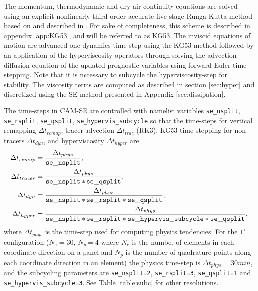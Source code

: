 \documentclass{agujournal}
\begin{document}
{The momentum, thermodynamic and dry air continuity equations are solved using an explicit nonlinearly third-order accurate five-stage Runga-Kutta method based on \cite{KG1984MCSb} and described in \cite[][ see their equation (56)]{GU2016GMD}. For sake of completeness, this scheme is described in appendix \ref{app:KG53}, and will be referred to as KG53.  The inviscid equations of motion are advanced one dynamics time-step using the KG53 method followed by an application of the hyperviscosity operators through solving the advection-diffusion equation of the updated prognostic variables using forward Euler time-stepping. Note that it is necessary to subcycle the hyperviscosity-step for stability. The viscosity terms are computed as described in section \ref{sec:hyper} and discretized using the SE method presented in Appendix \ref{sec:dissipation}.


The time-steps in CAM-SE are controlled with namelist variables {\tt{se\_nsplit}}, {\tt{se\_rsplit}}, {\tt{se\_qsplit}},
{\tt{se\_hypervis\_subcycle}}  so that the time-steps for vertical remapping $\Delta t_{remap}$, tracer advection $\Delta t_{trac}$ (RK3), KG53 time-stepping for non-tracers $\Delta t_{dyn}$, and hyperviscosity $\Delta t_{hyper}$ are
\begin{align}
\Delta t_{remap}&=\frac{\Delta t_{phys}}{\tt{se\_nsplit}},\\
\Delta t_{tracer}&=\frac{\Delta t_{phys}}{\tt{se\_nsplit}*\tt{se\_qsplit}},\\
\Delta t_{dyn}&=\frac{\Delta t_{phys}}{\tt{se\_nsplit*se\_rsplit}*\tt{se\_qsplit}},\\
\Delta t_{hyper}&=\frac{\Delta t_{phys}}{\tt{se\_nsplit*se\_rsplit*se\_hypervis\_subcycle}*\tt{se\_qsplit}},
\end{align}
where $\Delta t_{phys}$ is the time-step used for computing physics tendencies. For the $1^\circ$ configuration ($N_e=30$, $N_p=4$ where $N_e$ is the number of elements in each coordinate direction on a panel and $N_p$ is the number of quadrature points along each coordinate direction in an element) the physics time-step is $\Delta t_{phys}=30 min$, and the subcycling parameters are {\tt{se\_nsplit}=2}, {\tt{se\_rsplit=3}}, {\tt{se\_qsplit=1}} and {\tt{se\_hypervis\_subcycle=3}}. See Table \ref{table:subc} for other resolutions.

}
\end{document}
